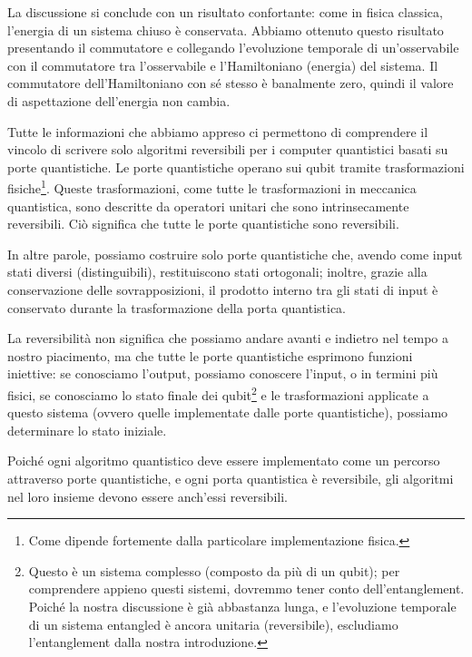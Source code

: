 La discussione si conclude con un risultato confortante: come in fisica classica, l'energia di un sistema chiuso è conservata. Abbiamo ottenuto questo risultato presentando il commutatore e collegando l'evoluzione temporale di un'osservabile con il commutatore tra l'osservabile e l'Hamiltoniano (energia) del sistema. Il commutatore dell'Hamiltoniano con sé stesso è banalmente zero, quindi il valore di aspettazione dell'energia non cambia.

Tutte le informazioni che abbiamo appreso ci permettono di comprendere il vincolo di scrivere solo algoritmi reversibili per i computer quantistici basati su porte quantistiche. Le porte quantistiche operano sui qubit tramite trasformazioni fisiche\footnote{Come dipende fortemente dalla particolare implementazione fisica.}. Queste trasformazioni, come tutte le trasformazioni in meccanica quantistica, sono descritte da operatori unitari che sono intrinsecamente reversibili. Ciò significa che tutte le porte quantistiche sono reversibili.

In altre parole, possiamo costruire solo porte quantistiche che, avendo come input stati diversi (distinguibili), restituiscono stati ortogonali; inoltre, grazie alla conservazione delle sovrapposizioni, il prodotto interno tra gli stati di input è conservato durante la trasformazione della porta quantistica.

La reversibilità non significa che possiamo andare avanti e indietro nel tempo a nostro piacimento, ma che tutte le porte quantistiche esprimono funzioni iniettive: se conosciamo l'output, possiamo conoscere l'input, o in termini più fisici, se conosciamo lo stato finale dei qubit\footnote{Questo è un sistema complesso (composto da più di un qubit); per comprendere appieno questi sistemi, dovremmo tener conto dell'entanglement. Poiché la nostra discussione è già abbastanza lunga, e l'evoluzione temporale di un sistema entangled è ancora unitaria (reversibile), escludiamo l'entanglement dalla nostra introduzione.} e le trasformazioni applicate a questo sistema (ovvero quelle implementate dalle porte quantistiche), possiamo determinare lo stato iniziale.

Poiché ogni algoritmo quantistico deve essere implementato come un percorso attraverso porte quantistiche, e ogni porta quantistica è reversibile, gli algoritmi nel loro insieme devono essere anch'essi reversibili.